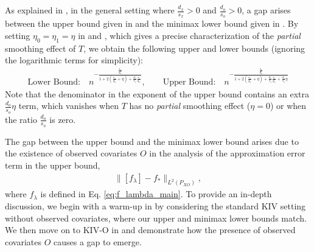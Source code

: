 \documentclass[11pt]{article}
\newcommand{\0}{\mathbf{0}}
\begin{document}
As explained in , in the general setting where $\frac{d_x}{s_x}>0$ and $\frac{d_o}{s_o}>0$, a gap arises between the upper bound given in  and the minimax lower bound given in . By setting $\eta_0 = \eta_1 = \eta$ in  and ,  which gives a precise characterization of the \emph{partial} smoothing effect of $T$, we obtain the following upper and lower bounds (ignoring the logarithmic terms for simplicity): 
\begin{align*}
    \text{Lower Bound:} \quad n^{-\frac{\frac{s_x}{d_x}}{1 + 2(\frac{s_x}{d_x}+\eta) + \frac{d_o}{s_o}\frac{s_x}{d_x}}} , \quad\quad \text{Upper Bound:} \quad n^{-\frac{\frac{s_x}{d_x}}{1 + 2(\frac{s_x}{d_x}+\eta) + \frac{d_o}{s_o}\frac{s_x}{d_x} + \frac{d_o}{s_o}\eta}} 
\end{align*}
Note that the denominator in the exponent of the upper bound contains an extra $\frac{d_o}{s_o}\eta$ term, which vanishes when $T$ has no \emph{partial} smoothing effect ($\eta=0$) or when the ratio $\frac{d_o}{s_o}$ is zero. 

The gap between the upper bound and the minimax lower bound arises due to the existence of observed covariates $O$ in the analysis of the approximation error term in the upper bound, 
\begin{align*}
    \|[f_{\lambda}] - f_{\ast}\|_{L^2(P_{XO})},
\end{align*}
where $f_{\lambda}$ is defined in Eq. \eqref{eq:f_lambda_main}. To provide an in-depth discussion, we begin with a warm-up in  by considering the standard KIV setting without observed covariates, where our upper and minimax lower bounds match. We then move on to KIV-O in  and demonstrate how the presence of observed covariates $O$ causes a gap to emerge.
\end{document}
